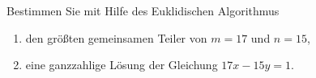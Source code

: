 \begin{aufgabe}
Bestimmen Sie mit Hilfe des Euklidischen Algorithmus
\begin{enumerate}[label=\alph*)]
  \item den größten gemeinsamen Teiler von $m = 17$ und $n = 15$,
  \item eine ganzzahlige Lösung der Gleichung $17x - 15y = 1$.
\end{enumerate}
\end{aufgabe}
